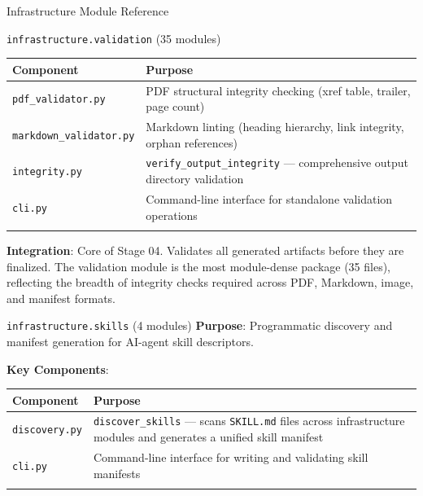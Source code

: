 \documentclass[
  ignorenonframetext,
]{beamer}
\newcounter{none} %
\begin{document}
\begin{frame}[fragile]{Infrastructure Module Reference}
\begin{block}{\texttt{infrastructure.validation} (35 modules)}
{\def\LTcaptype{none} %
\begin{longtable}[]{@{}
  >{\raggedright\arraybackslash}p{}
  >{\raggedright\arraybackslash}p{}@{}}
\toprule\noalign{}
\begin{minipage}[b]{\linewidth}\raggedright
Component
\end{minipage} & \begin{minipage}[b]{\linewidth}\raggedright
Purpose
\end{minipage} \\
\midrule\noalign{}
\endhead
\texttt{pdf\_validator.py} & PDF structural integrity checking (xref
table, trailer, page count) \\
\texttt{markdown\_validator.py} & Markdown linting (heading hierarchy,
link integrity, orphan references) \\
\texttt{integrity.py} & \texttt{verify\_output\_integrity} ---
comprehensive output directory validation \\
\texttt{cli.py} & Command-line interface for standalone validation
operations \\
\bottomrule\noalign{}
\end{longtable}
}

\textbf{Integration}: Core of Stage 04. Validates all generated
artifacts before they are finalized. The validation module is the most
module-dense package (35 files), reflecting the breadth of integrity
checks required across PDF, Markdown, image, and manifest formats.
\end{block}

\begin{block}{\texttt{infrastructure.skills} (4 modules)}
\protect{}\label{infrastructure.skills-4-modules}
\textbf{Purpose}: Programmatic discovery and manifest generation for
AI-agent skill descriptors.

\textbf{Key Components}:

{\def\LTcaptype{none} %
\begin{longtable}[]{@{}
  >{\raggedright\arraybackslash}p{}
  >{\raggedright\arraybackslash}p{}@{}}
\toprule\noalign{}
\begin{minipage}[b]{\linewidth}\raggedright
Component
\end{minipage} & \begin{minipage}[b]{\linewidth}\raggedright
Purpose
\end{minipage} \\
\midrule\noalign{}
\endhead
\texttt{discovery.py} & \texttt{discover\_skills} --- scans
\texttt{SKILL.md} files across infrastructure modules and generates a
unified skill manifest \\
\texttt{cli.py} & Command-line interface for writing and validating
skill manifests \\
\bottomrule\noalign{}
\end{longtable}
}


\end{block}
\end{frame}
\end{document}
